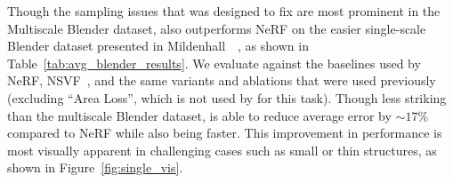 \documentclass[10pt,twocolumn,letterpaper]{article}
\begin{document}
\begin{table}[]
    \centering
    \vspace{-0.1in}
    \caption{
    A comparison of \shortmodelnamelower and its ablations against several baseline algorithms and variants of NeRF on the single-scale Blender dataset of Mildenhall~\etal~\cite{mildenhall2020}. Training times taken from prior work (when available) are indicated in gray, as they are not directly comparable.
    }
    \label{tab:avg_blender_results}
\end{table}



 Though the sampling issues that \shortmodelnamelower was designed to fix are most prominent in the Multiscale Blender dataset, \shortmodelnamelower also outperforms NeRF on the easier single-scale Blender dataset presented in Mildenhall~\etal~\cite{mildenhall2020}, as shown in Table~\ref{tab:avg_blender_results}. We evaluate against the baselines used by NeRF, NSVF~\cite{liu2020neural}, and the same variants and ablations that were used previously (excluding ``Area Loss'', which is not used by \shortmodelnamelower for this task). Though less striking than the multiscale Blender dataset, \shortmodelnamelower is able to reduce average error by $\sim\!17\%$ compared to NeRF while also being faster. This improvement in performance is most visually apparent in challenging cases such as small or thin structures, as shown in Figure~\ref{fig:single_vis}.
\end{document}
